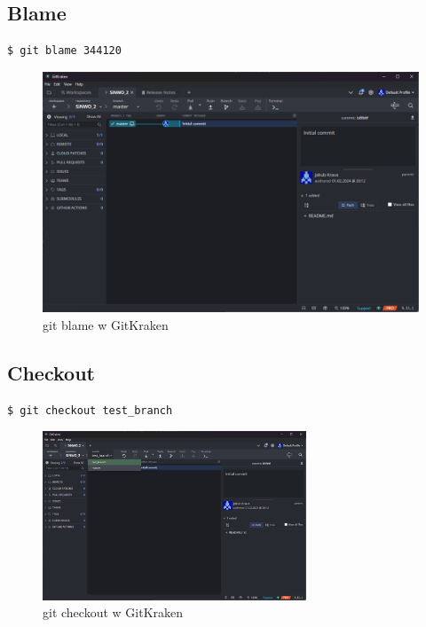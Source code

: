\documentclass[a4paper,12pt]{article}
\begin{document}
\subsection{Blame}
\begin{lstlisting}[caption={Blame w terminalu},captionpos=b]
    $ git blame 344120
\end{lstlisting}
\begin{figure}[ht]
    \centering
    \includegraphics[width=1\textwidth]{images/blame.png}
    \caption{git blame w GitKraken}
\end{figure}

\newpage
\clearpage

\subsection{Checkout}
\begin{lstlisting}[caption={Checkout w terminalu},captionpos=b]
    $ git checkout test_branch
\end{lstlisting}
\begin{figure}[ht]
    \centering
    \includegraphics[width=0.7\textwidth]{images/checkout.png}
    \caption{git checkout w GitKraken}
\end{figure}
\end{document}

